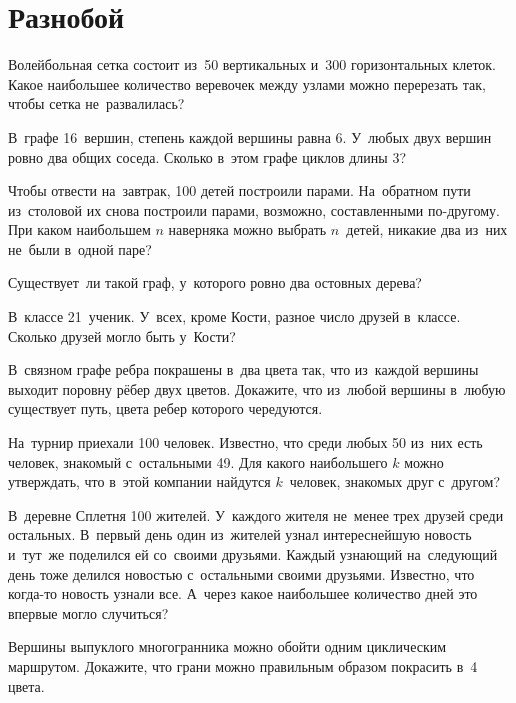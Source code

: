 
\section*{Разнобой}


\begin{problems}

\item
Волейбольная сетка состоит из~50 вертикальных и~300 горизонтальных клеток.
Какое наибольшее количество веревочек между узлами можно перерезать так, чтобы
сетка не~развалилась?

\item
В~графе 16~вершин, степень каждой вершины равна 6.
У~любых двух вершин ровно два общих соседа.
Сколько в~этом графе циклов длины 3?

\item
Чтобы отвести на~завтрак, 100 детей построили парами.
На~обратном пути из~столовой их снова построили парами, возможно, составленными
по-другому.
При каком наибольшем $n$ наверняка можно выбрать $n$~детей, никакие два из~них
не~были в~одной паре?

\item
Существует~ли такой граф, у~которого ровно два остовных дерева?

\item
В~классе 21~ученик.
У~всех, кроме Кости, разное число друзей в~классе.
Сколько друзей могло быть у~Кости?

\item
В~связном графе ребра покрашены в~два цвета так, что из~каждой вершины выходит
поровну рёбер двух цветов.
Докажите, что из~любой вершины в~любую существует путь, цвета ребер которого
чередуются.

\item
На~турнир приехали 100 человек.
Известно, что среди любых 50 из~них есть человек, знакомый с~остальными 49.
Для какого наибольшего $k$ можно утверждать, что в~этой компании найдутся
$k$~человек, знакомых друг с~другом?

\item
В~деревне Сплетня 100 жителей.
У~каждого жителя не~менее трех друзей среди остальных.
 В~первый день один из~жителей узнал интереснейшую новость и~тут~же поделился
ей со~своими друзьями.
Каждый узнающий на~следующий день тоже делился новостью с~остальными своими
друзьями.
Известно, что когда-то новость узнали все.
А~через какое наибольшее количество дней это впервые могло случиться?

\item
Вершины выпуклого многогранника можно обойти одним циклическим маршрутом.
Докажите, что грани можно правильным образом покрасить в~4 цвета.

\end{problems}

